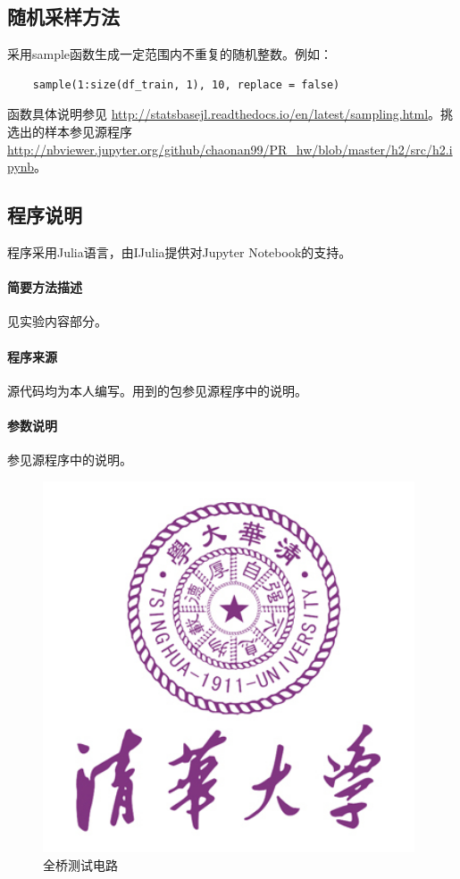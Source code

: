 \subsection{随机采样方法}
采用{\ttfamily sample}函数生成一定范围内不重复的随机整数。例如：
\begin{lstlisting}
	sample(1:size(df_train, 1), 10, replace = false)
\end{lstlisting}
函数具体说明参见 \url{http://statsbasejl.readthedocs.io/en/latest/sampling.html}。挑选出的样本参见源程序 \url{http://nbviewer.jupyter.org/github/chaonan99/PR_hw/blob/master/h2/src/h2.ipynb}。

\subsection{程序说明}
程序采用{\ttfamily Julia}语言，由{\ttfamily IJulia}提供对{\ttfamily Jupyter Notebook}的支持。
\paragraph{简要方法描述} 见实验内容部分。
\paragraph{程序来源} 源代码均为本人编写。用到的包参见源程序中的说明。
\paragraph{参数说明} 参见源程序中的说明。

\begin{figure}[htbp]
\centering
\includegraphics[width=11cm]{resource/logo.jpg}
\caption{全桥测试电路}
\label{fig:fullarm}
\end{figure}


